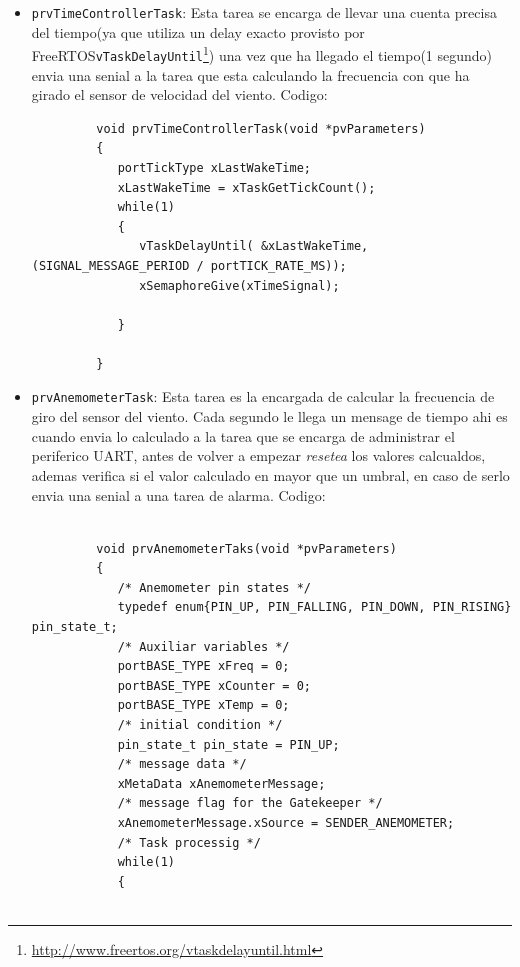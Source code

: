 \documentclass[10pt]{article}
\begin{document}
\begin{itemize}
   \item \verb|prvTimeControllerTask|: Esta tarea se encarga de llevar una cuenta precisa del tiempo(ya que utiliza un delay exacto provisto por FreeRTOS\texttrademark \verb|vTaskDelayUntil|\footnote{\url{http://www.freertos.org/vtaskdelayuntil.html}}) una vez que ha llegado el tiempo(1 segundo) envia una
      senial a la tarea que esta calculando la frecuencia con que ha girado el sensor de velocidad del viento. Codigo:
      \begin{verbatim}
         void prvTimeControllerTask(void *pvParameters)
         {
            portTickType xLastWakeTime;
            xLastWakeTime = xTaskGetTickCount();
            while(1)
            {
               vTaskDelayUntil( &xLastWakeTime, (SIGNAL_MESSAGE_PERIOD / portTICK_RATE_MS));
               xSemaphoreGive(xTimeSignal);

            }

         }
      \end{verbatim}
   \item\verb|prvAnemometerTask|: Esta tarea es la encargada de calcular la frecuencia de giro del sensor del viento. Cada segundo le llega un mensage de tiempo ahi es cuando envia lo calculado a la tarea que se encarga de administrar el periferico UART, antes de volver a empezar \textit{resetea} los valores calcualdos, ademas verifica si el valor calculado en mayor que un umbral, en caso de serlo envia una senial a una tarea de alarma. Codigo:
      \begin{verbatim}
         
         void prvAnemometerTaks(void *pvParameters)
         {
            /* Anemometer pin states */
            typedef enum{PIN_UP, PIN_FALLING, PIN_DOWN, PIN_RISING} pin_state_t;
            /* Auxiliar variables */
            portBASE_TYPE xFreq = 0;
            portBASE_TYPE xCounter = 0;
            portBASE_TYPE xTemp = 0;
            /* initial condition */
            pin_state_t pin_state = PIN_UP;
            /* message data */
            xMetaData xAnemometerMessage;
            /* message flag for the Gatekeeper */
            xAnemometerMessage.xSource = SENDER_ANEMOMETER;
            /* Task processig */
            while(1)
            {


\end{verbatim}
\end{itemize}
\end{document}
